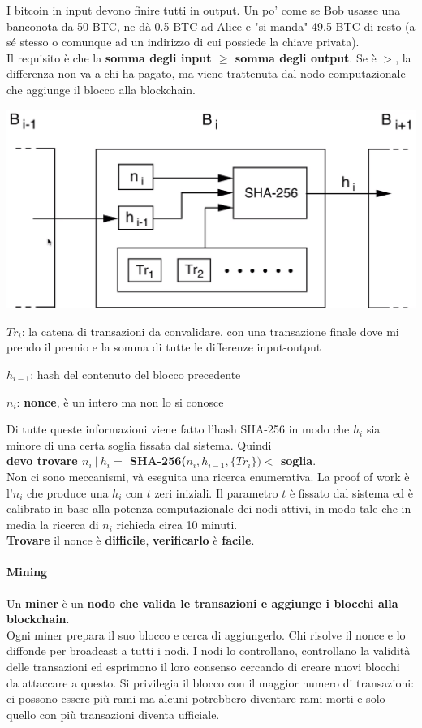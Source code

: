 \documentclass[10pt]{book}
\begin{document}
I bitcoin in input devono finire tutti in output. Un po' come se Bob usasse una banconota da 50 BTC, ne dà 0.5 BTC ad Alice e "si manda" 49.5 BTC di resto (a sé stesso o comunque ad un indirizzo di cui possiede la chiave privata).\\
Il requisito è che la \textbf{somma degli input $\geq$ somma degli output}. Se è $>$, la differenza non va a chi ha pagato, ma viene trattenuta dal nodo computazionale che aggiunge il blocco alla blockchain.
\begin{center}
	\includegraphics[scale=0.33]{24.png}
\end{center}
\begin{list}{}{}
		\item $Tr_i$: la catena di transazioni da convalidare, con una transazione finale dove mi prendo il premio e la somma di tutte le differenze input-output
		\item $h_{i-1}$: hash del contenuto del blocco precedente
		\item $n_i$: \textbf{nonce}, è un intero ma non lo si conosce
	\end{list}
	Di tutte queste informazioni viene fatto l'hash SHA-256 in modo che $h_i$ sia minore di una certa soglia fissata dal sistema. Quindi\\ \textbf{devo trovare $n_i\:|\: h_i =$ SHA-256($n_i,h_{i-1},\{Tr_i\}) <$ soglia}.\\
Non ci sono meccanismi, và eseguita una ricerca enumerativa. La proof of work è l'$n_i$ che produce una $h_i$ con $t$ zeri iniziali. Il parametro $t$ è fissato dal sistema ed è calibrato in base alla potenza computazionale dei nodi attivi, in modo tale che in media la ricerca di $n_i$ richieda circa 10 minuti.\\
\textbf{Trovare} il nonce è \textbf{difficile}, \textbf{verificarlo} è \textbf{facile}.
\paragraph{Mining} Un \textbf{miner} è un \textbf{nodo che valida le transazioni e aggiunge i blocchi alla blockchain}.\\
Ogni miner prepara il suo blocco e cerca di aggiungerlo. Chi risolve il nonce e lo diffonde per broadcast a tutti i nodi. I nodi lo controllano, controllano la validità delle transazioni ed esprimono il loro consenso cercando di creare nuovi blocchi da attaccare a questo. Si privilegia il blocco con il maggior numero di transazioni: ci possono essere più rami ma alcuni potrebbero diventare rami morti e solo quello con più transazioni diventa ufficiale.
\end{document}
